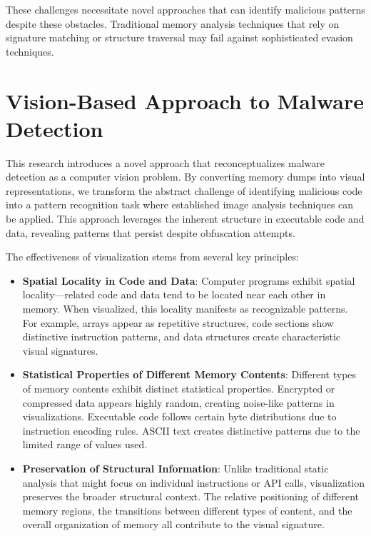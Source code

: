 These challenges necessitate novel approaches that can identify malicious patterns despite these obstacles. Traditional memory analysis techniques that rely on signature matching or structure traversal may fail against sophisticated evasion techniques.

\section{Vision-Based Approach to Malware Detection}
\label{sec:vision_approach}

This research introduces a novel approach that reconceptualizes malware detection as a computer vision problem. By converting memory dumps into visual representations, we transform the abstract challenge of identifying malicious code into a pattern recognition task where established image analysis techniques can be applied. This approach leverages the inherent structure in executable code and data, revealing patterns that persist despite obfuscation attempts.

The effectiveness of visualization stems from several key principles:

\begin{itemize}
    \item \textbf{Spatial Locality in Code and Data}: Computer programs exhibit spatial locality—related code and data tend to be located near each other in memory. When visualized, this locality manifests as recognizable patterns. For example, arrays appear as repetitive structures, code sections show distinctive instruction patterns, and data structures create characteristic visual signatures.
    
    \item \textbf{Statistical Properties of Different Memory Contents}: Different types of memory contents exhibit distinct statistical properties. Encrypted or compressed data appears highly random, creating noise-like patterns in visualizations. Executable code follows certain byte distributions due to instruction encoding rules. ASCII text creates distinctive patterns due to the limited range of values used.
    
    \item \textbf{Preservation of Structural Information}: Unlike traditional static analysis that might focus on individual instructions or API calls, visualization preserves the broader structural context. The relative positioning of different memory regions, the transitions between different types of content, and the overall organization of memory all contribute to the visual signature.
\end{itemize}

